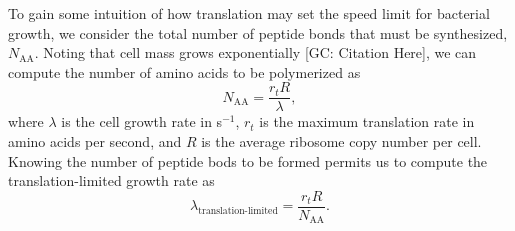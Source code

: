 %

To gain some intuition of how translation may set the speed limit for bacterial
growth, we consider the total number of peptide bonds that must be synthesized,
$N_\text{AA}$. Noting that cell mass grows exponentially [GC: Citation Here], we can
compute the number of amino acids to be polymerized as
\begin{equation}
    N_\text{AA} = \frac{r_t R}{\lambda},
\end{equation}
where $\lambda$ is the cell growth rate in s$^{-1}$, $r_t$ is the maximum translation rate in
amino acids per second, and $R$ is the average ribosome copy number per cell.
Knowing the number of peptide bods to be formed permits us to compute the
translation-limited growth rate as 
\begin{equation}
    \lambda_\text{translation-limited} = \frac{r_t R}{N_\text{AA}}.
\end{equation}

